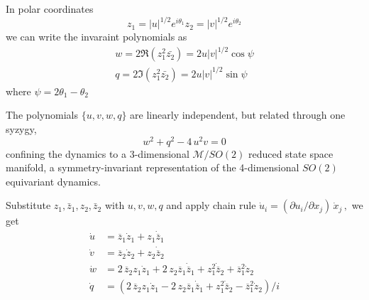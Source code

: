 \documentclass{article}
\begin{document}
In polar coordinates
\begin{equation}
z_1=|u|^{1/2}e^{i\theta_1}
z_2=|v|^{1/2}e^{i\theta_2}
\end{equation}
we can write the invaraint polynomials as
\begin{align}
w=2\Re(z_1^2\bar{z_2})=2u|v|^{1/2}\cos\psi\\
q=2\Im(z_1^2\bar{z_2})=2u|v|^{1/2}\sin\psi
\label{Dang86(1.2)polar}
\end{align}
where $\psi=2\theta_1-\theta_2$



 The polynomials $\{u,v,w,q\}$ are
linearly independent, but related through one syzygy,
\begin{equation}
w^2+q^2 - 4\,u^2v =0
\label{eq:syzPK}
\end{equation}
confining the dynamics to a 3-dim\-ens\-ion\-al $\mathcal{M}/SO(2)$ reduced state space
manifold, a symmetry-invariant repre\-sent\-ati\-on of the 4-dim\-ens\-ion\-al
$SO(2)$ equivariant dynamics.

Substitute ${z_1,\bar{z}_1,z_2,\bar{z}_2}$ with ${u,v,w,q}$ and apply chain rule
\( %
 \dot{ u}_i= ({\partial u_i}/{\partial x_j}) \, \dot{x}_j
 \,,
\) %
we get
\begin{align}
  \dot{u} &=\overline{z}_1 \dot{z}_1 + {z}_1 \dot{\overline{z}}_1\\
  \dot{v} &= \overline{z}_2 \dot{z}_2 + {z}_2 \dot{\overline{z}}_2\\
  \dot{w} &= 2 \,\overline{z}_2 {z}_1 \dot{z}_1
           + 2\,{z}_2 \overline{z}_1 \dot{\overline{z}}_1
           + {z}_1^2 \dot{\overline{z}}_2
           + \overline{z}_1^2 \dot{z}_2\\
  \dot{q} &=  (2\,\overline{z}_2 {z}_1 \dot{z}_1
           - 2\,{z}_2 \overline{z}_1 \dot{\overline{z}}_1
           + {z}_1^2 \dot{\overline{z}}_2
           - \overline{z}_1^2 \dot{z}_2
           )/i
\label{PKinvEqs}
\end{align}
\end{document}
